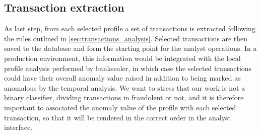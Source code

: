 \subsection{Transaction extraction}
As last step, from each selected profile a set of transactions is extracted following the rules outlined in \ref{sec:transactions_analysis}. Selected transactions are then saved to the database and form the starting point for the analyst operations. In a production environment, this information would be integrated with the local profile analysis performed by banksealer, in which case the selected transactions could have their overall anomaly value raised in addition to being marked as anomalous by the temporal analysis.
We want to stress that our work is not a binary classifier, dividing transactions in fraudolent or not, and it is therefore important to associated the anomaly value of the profile with each selected transaction, so that it will be rendered in the correct order in the analyst interface.
